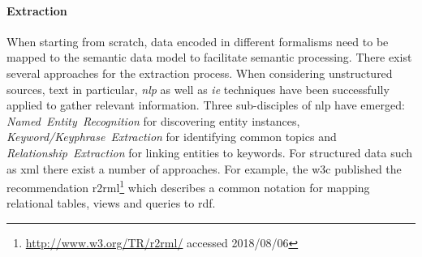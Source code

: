 \paragraph{Extraction} When starting from scratch, data encoded in different formalisms need to be mapped to the semantic data model to facilitate semantic processing. 
There exist several approaches for the extraction process. When considering unstructured sources, text in particular, \emph{\gls{nlp}} as well as \emph{\gls{ie}} techniques have been successfully applied to gather relevant information. Three sub-disciples of \gls{nlp} have emerged: \emph{Named~Entity~Recognition} for discovering entity instances, \emph{Keyword/Keyphrase~Extraction} for identifying common topics and \emph{Relationship~Extraction} for linking entities to keywords. For structured data such as \gls{xml} there exist a number of approaches. For example, the \gls{w3c} published the recommendation \gls{r2rml}\footnote{\url{http://www.w3.org/TR/r2rml/} accessed 2018/08/06} which describes a common notation for mapping relational tables, views and queries to \gls{rdf}. 

